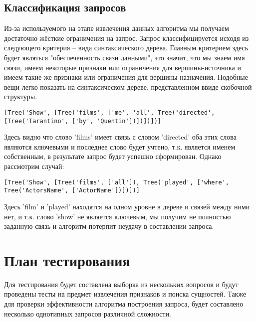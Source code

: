 \subsection{Классификация запросов}
Из-за используемого на этапе извлечения данных алгоритма мы получаем достаточно жёсткие ограничения на запрос. Запрос классифицируется исходя из следующего критерия -- вида синтаксического дерева. Главным критерием здесь будет являться "обеспеченность связи данными", это значит, что мы знаем имя связи, имеем некоторые признаки или ограничения для вершины-источника и имеем такие же признаки или ограничения для вершины-назначения. Подобные вещи легко показать на синтаксическом дереве, представленном ввиде скобочной структуры.
\begin{lstlisting}
[Tree('Show', [Tree('films', ['me', 'all', Tree('directed', [Tree('Tarantino', ['by', 'Quentin'])])])])]
\end{lstlisting}
Здесь видно что слово 'films' имеет связь с словом 
'directed' оба этих слова являются ключевыми и последнее слово будет учтено, т.к. является именем собственным, в результате запрос будет успешно сформирован.
Однако рассмотрим случай:
\begin{lstlisting}
[Tree('Show', [Tree('films', ['all']), Tree('played', ['where', Tree('ActorsName', ['ActorName'])])])]
\end{lstlisting}
Здесь 'film' и 'played' находятся на одном уровне в дереве и связей между ними нет, и т.к. слово 'show' не является ключевым, мы получим не полностью заданную связь и алгоритм потерпит неудачу в составлении запроса.

\section{План тестирования}
Для тестирования будет составлена выборка из нескольких вопросов и будут проведены тесты на предмет извлечения признаков и поиска сущностей. Также для проверки эффективности алгоритма построения запроса, будет составлено несколько однотипных запросов различной сложности.

